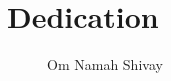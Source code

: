 \chapter{Dedication}

\begin{figure}[htbp]
	\centering
	\begin{subfigure}[b]{0.45\textwidth}
	\end{subfigure}
	\hfill
	\begin{subfigure}[b]{0.45\textwidth}
	\end{subfigure}
	\caption{Om Namah Shivay}
	\label{fig:dedication}
\end{figure}
